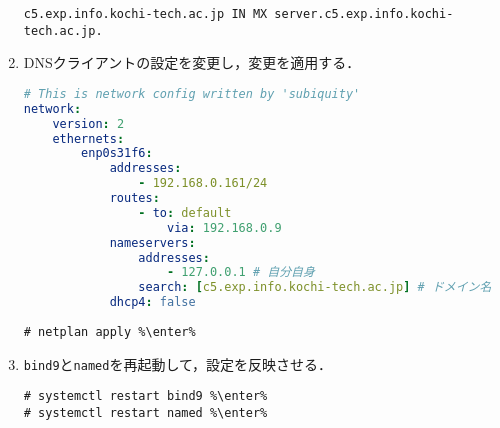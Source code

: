 \begin{enumerate}
\begin{lstlisting}[style=file,caption={\ttfamily /etc/bind/c5.zone},language=dns]
c5.exp.info.kochi-tech.ac.jp IN MX server.c5.exp.info.kochi-tech.ac.jp.
    \end{lstlisting}
    \item DNSクライアントの設定を変更し，変更を適用する．
          \begin{lstlisting}[style=file,language=yaml,caption={\ttfamily /etc/netlpan/00-install-config.yaml}]
# This is network config written by 'subiquity'
network:
    version: 2
    ethernets:
        enp0s31f6:
            addresses:
                - 192.168.0.161/24
            routes:
                - to: default
                    via: 192.168.0.9
            nameservers:
                addresses:
                    - 127.0.0.1 # 自分自身
                search: [c5.exp.info.kochi-tech.ac.jp] # ドメイン名
            dhcp4: false
\end{lstlisting}
          \begin{lstlisting}
# netplan apply %\enter%
\end{lstlisting}
    \item \texttt{bind9}と\texttt{named}を再起動して，設定を反映させる．
          \begin{lstlisting}
# systemctl restart bind9 %\enter%
# systemctl restart named %\enter%
    \end{lstlisting}
\end{enumerate}
